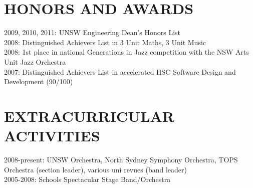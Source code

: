 \documentclass{res}
\begin{document}
\begin{resume}
 
\section{HONORS AND AWARDS}          
    2009, 2010, 2011: UNSW Engineering Dean's Honors List \\
    2008: Distinguished Achievers List in 3 Unit Maths, 3 Unit Music \\
    2008: 1st place in national Generations in Jazz competition with the NSW Arts Unit Jazz Orchestra \\
    2007: Distinguished Achievers List in accelerated HSC Software Design and Development (90/100)
 
\section{EXTRACURRICULAR ACTIVITIES}          
    2008-present: UNSW Orchestra, North Sydney Symphony Orchestra, TOPS Orchestra (section leader), various uni revues (band leader) \\
    2005-2008: Schools Spectacular Stage Band/Orchestra
 
\end{resume}
\end{document}
